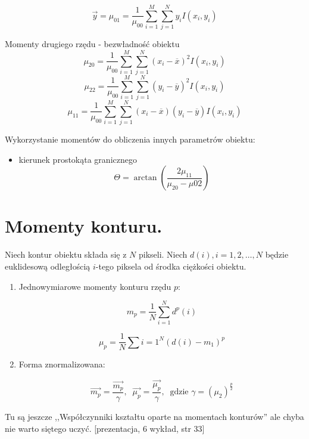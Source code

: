 \documentclass[a4paper,10pt]{article}
\begin{document}
\begin{equation}
  \overrightarrow{y} = \mu_{01} = \frac{1}{\mu_{00}} \sum_{i=1}^{M} \sum_{j=1}^{N} y_i I(x_i, y_i)
\end{equation}

Momenty drugiego rzędu - bezwładność obiektu
\begin{equation}
  \mu_{20} = \frac{1}{\mu_{00}} \sum_{i=1}^{M} \sum_{j=1}^{N} (x_i - \overline{x})^2 I(x_i, y_i)
\end{equation}
\begin{equation}
  \mu_{22} = \frac{1}{\mu_{00}} \sum_{i=1}^{M} \sum_{j=1}^{N} (y_i - \overline{y})^2 I(x_i, y_i)
\end{equation}
\begin{equation}
  \mu_{11} = \frac{1}{\mu_{00}} \sum_{i=1}^{M} \sum_{j=1}^{N} (x_i - \overline{x})(y_i - \overline{y}) I(x_i, y_i)
\end{equation}

Wykorzystanie momentów do obliczenia innych parametrów obiektu:
\begin{itemize}
 \item kierunek prostokąta granicznego
 \begin{equation}
   \Theta = \arctan \left(\frac{2 \mu_{11}}{\mu_{20} - \mu{02}}\right)
 \end{equation}
\end{itemize}

\section{Momenty konturu.}
Niech kontur obiektu składa się z $N$ pikseli. 
Niech $d(i), i=1,2,\ldots,N$ będzie euklidesową odległością $i$-tego piksela od środka ciężkości obiektu.

\begin{enumerate}
\item Jednowymiarowe momenty konturu rzędu $p$:

\begin{equation}
m_p = \frac{1}{N} \sum_{i=1}^{N} d^p(i)
\end{equation}

\begin{equation}
\mu_p = \frac{1}{N} \sum{i=1}^{N} (d(i) - m_1)^p
\end{equation}

\item Forma znormalizowana:

\begin{equation}
\overrightarrow{m_p} = \frac{\overrightarrow{m_p}}{\gamma},\;\; \overrightarrow{\mu_p} = \frac{\overrightarrow{\mu_p}}{\gamma}, \;\; \mbox{gdzie } \gamma = (\mu_2)^{\frac{p}{2}}
\end{equation}
\end{enumerate}

Tu są jeszcze ,,Współczynniki kształtu oparte na momentach konturów'' ale chyba nie warto siętego uczyć. [prezentacja, 6 wykład, str 33]
\end{document}
